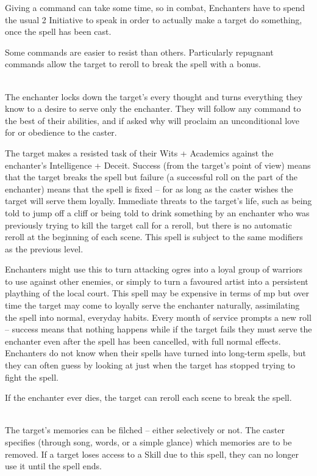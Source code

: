\begin{multicols}{2}

Giving a command can take some time, so in combat, Enchanters have to spend the usual 2 Initiative to speak in order to actually make a target do something, once the spell has been cast.

Some commands are easier to resist than others. Particularly repugnant commands allow the target to reroll to break the spell with a bonus.

\spelllevel

\\
The enchanter locks down the target's every thought and turns everything they know to a desire to serve only the enchanter. They will follow any command to the best of their abilities, and if asked why will proclaim an unconditional love for or obedience to the caster.

The target makes a resisted task of their Wits + Academics against the enchanter's Intelligence + Deceit.
Success (from the target's point of view) means that the target breaks the spell but failure (a successful roll on the part of the enchanter) means that the spell is fixed -- for as long as the caster wishes the target will serve them loyally.
Immediate threats to the target's life, such as being told to jump off a cliff or being told to drink something by an enchanter who was previously trying to kill the target call for a reroll, but there is no automatic reroll at the beginning of each scene.
This spell is subject to the same modifiers as the previous level.

Enchanters might use this to turn attacking ogres into a loyal group of warriors to use against other enemies, or simply to turn a favoured artist into a persistent plaything of the local court. This spell may be expensive in terms of \gls{mp} but over time the target may come to loyally serve the enchanter naturally, assimilating the spell into normal, everyday habits. Every month of service prompts a new roll -- success means that nothing happens while if the target fails they must serve the enchanter even after the spell has been cancelled, with full normal effects. Enchanters do not know when their spells have turned into long-term spells, but they can often guess by looking at just when the target has stopped trying to fight the spell.

If the enchanter ever dies, the target can reroll each scene to break the spell.

\\
The target's memories can be filched -- either selectively or not. The caster specifies (through song, words, or a simple glance) which memories are to be removed. If a target loses access to a Skill due to this spell, they can no longer use it until the spell ends.


\end{multicols}
